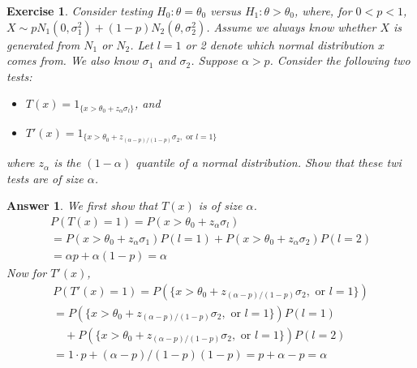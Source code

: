 \documentclass[12pt]{article}
\theoremstyle{colon}
\newtheorem{exercise}{Exercise}
\newtheorem*{answer}{Answer}
\begin{document}
\clearpage

\begin{exercise}
  Consider testing $H_0 : \theta = \theta_0$ versus $H_1 : \theta > \theta_0$, where, for $ 0 < p < 1$, $X \sim pN_1(0,\sigma_1^2) + (1-p)N_2(\theta, \sigma_2^2)$. Assume we always know whether $X$ is generated from $N_1$ or $N_2$. Let $l = 1$ or 2 denote which normal distribution $x$ comes from. We also know $\sigma_1$ and $\sigma_2$. Suppose $\alpha > p$. Consider the following two tests:
  \begin{itemize}
      \item $T(x) = 1_{\{ x > \theta_0 + z_\alpha \sigma_l \}}$, and
      \item $T'(x) = 1_{\{ x > \theta_0 + z_{(\alpha-p)/(1-p)} \sigma_2, \text{ or } l = 1 \}}$
  \end{itemize}
  where $z_\alpha$ is the $(1-\alpha)$ quantile of a normal distribution. Show that these twi tests are of size $\alpha$.
\end{exercise}

\begin{answer}
  We first show that $T(x)$ is of size $\alpha$.
  \begin{gather*}
    P(T(x) = 1) = P(x > \theta_0 + z_\alpha \sigma_l) \\
    = P(x > \theta_0 + z_\alpha \sigma_1)P(l = 1) + P(x > \theta_0 + z_\alpha \sigma_2)P(l = 2) \\
    = \alpha p + \alpha (1-p) = \alpha
  \end{gather*}
  Now for $T'(x)$,
  \begin{gather*}
    P(T'(x) = 1) = P(\{ x > \theta_0 + z_{(\alpha-p)/(1-p)} \sigma_2, \text{ or } l = 1 \}) \\
    = P(\{ x > \theta_0 + z_{(\alpha-p)/(1-p)} \sigma_2, \text{ or } l = 1 \})P(l = 1) \\
    \quad + P(\{ x > \theta_0 + z_{(\alpha-p)/(1-p)} \sigma_2, \text{ or } l = 1 \})P(l = 2) \\
    = 1 \cdot p + (\alpha-p)/(1-p) (1-p) = p + \alpha - p = \alpha
  \end{gather*}
\end{answer}
\end{document}
